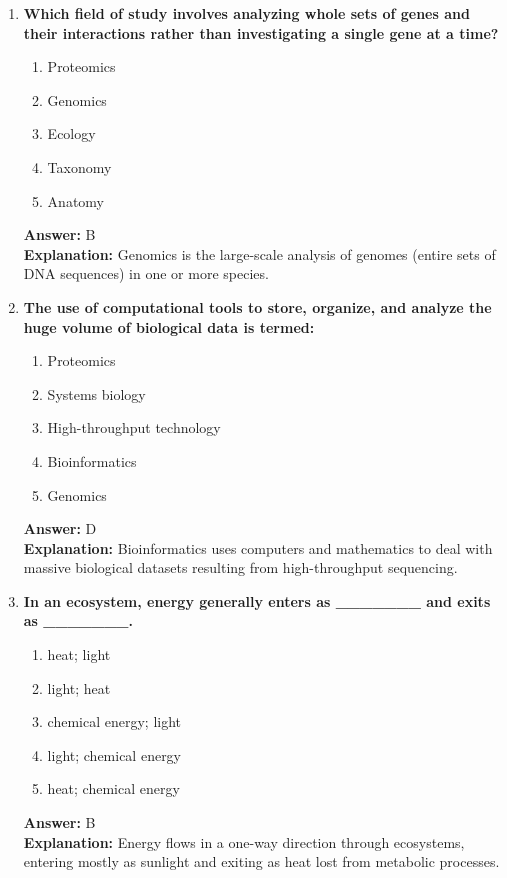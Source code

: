 \documentclass[11pt, a4paper]{article}
\begin{document}
\begin{enumerate}
\item \textbf{Which field of study involves analyzing whole sets of genes and their interactions rather than investigating a single gene at a time?}
\begin{enumerate}[label=\Alph*.]
    \item Proteomics
    \item Genomics
    \item Ecology
    \item Taxonomy
    \item Anatomy
\end{enumerate}
\textbf{Answer:} B \\
\textbf{Explanation:} Genomics is the large-scale analysis of genomes (entire sets of DNA sequences) in one or more species.

\item \textbf{The use of computational tools to store, organize, and analyze the huge volume of biological data is termed:}
\begin{enumerate}[label=\Alph*.]
    \item Proteomics
    \item Systems biology
    \item High-throughput technology
    \item Bioinformatics
    \item Genomics
\end{enumerate}
\textbf{Answer:} D \\
\textbf{Explanation:} Bioinformatics uses computers and mathematics to deal with massive biological datasets resulting from high-throughput sequencing.

\item \textbf{In an ecosystem, energy generally enters as \_\_\_\_\_\_\_ and exits as \_\_\_\_\_\_\_.}
\begin{enumerate}[label=\Alph*.]
    \item heat; light
    \item light; heat
    \item chemical energy; light
    \item light; chemical energy
    \item heat; chemical energy
\end{enumerate}
\textbf{Answer:} B \\
\textbf{Explanation:} Energy flows in a one-way direction through ecosystems, entering mostly as sunlight and exiting as heat lost from metabolic processes.


\end{enumerate}
\end{document}
